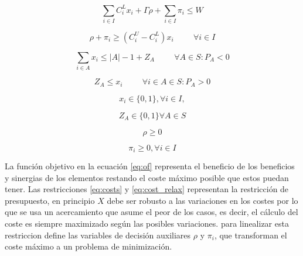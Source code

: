 \documentclass[spanish, a4paper, 12pt, openany,final]{book}
\begin{document}
    \begin{equation}
   		\label{eq:costs}
  		\sum_{i\in I}{C^L_ix_i} + \Gamma\rho+\sum_{i \in I} \pi_i \leq W
    \end{equation}
    
    \begin{equation}
    	\label{eq:cost_relax}
    	\rho + \pi_i \geq \left(C^U_i - C^L_i\right)x_i 
    	\hspace{1cm}
    	 \forall i \in I
    \end{equation}
    
    \begin{equation}
    	\label{eq:fijar_z}
    	\sum_{i\in A} x_i \leq |A| - 1 + Z_{A} \hspace{1cm} \forall A \in S:P_A < 0
    \end{equation}
   
    \begin{equation}
    	\label{eq:fijar_z_2}
    	Z_{A} \leq x_i \hspace{1cm} \forall i \in A \in S: P_A > 0
    \end{equation}
    
    \begin{equation}
    	x_i \in \{0,1\},
    	\forall i \in I,
    \end{equation}
    
    \begin{equation}
    	Z_{A} \in \{0,1\} \forall A \in S
    \end{equation}
    
    \begin{equation}
    	\rho \geq 0
    \end{equation}
    
    \begin{equation}
    	\pi_i \geq 0, \forall i \in I
    \end{equation}
    
    
    La función objetivo en la ecuación \eqref{eq:of} representa el beneficio de los beneficios y sinergias de los elementos restando el coste máximo posible que estos puedan tener. Las restricciones \eqref{eq:costs} y \eqref{eq:cost_relax} representan la restricción de presupuesto, en principio $X$ debe ser robusto a las variaciones en los costes por lo que se usa un acercamiento que asume el peor de los casos, es decir, el cálculo del coste es siempre maximizado según las posibles variaciones. \cite{baldo_polynomial_2023} para linealizar esta restriccion define las variables de decisión auxiliares $\rho$ y $\pi_i$, que transforman el coste máximo a un problema de minimización.
    
\end{document}

